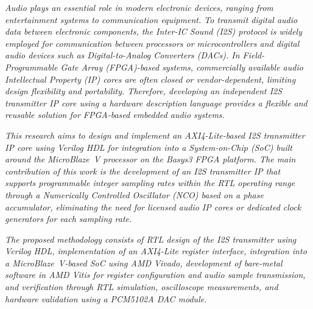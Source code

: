\hspace{1cm}\textit{Audio plays an essential role in modern electronic devices, ranging from entertainment systems to communication equipment. To transmit digital audio data between electronic components, the Inter-IC Sound (I2S) protocol is widely employed for communication between processors or microcontrollers and digital audio devices such as Digital-to-Analog Converters (DACs). In Field-Programmable Gate Array (FPGA)-based systems, commercially available audio Intellectual Property (IP) cores are often closed or vendor-dependent, limiting design flexibility and portability. Therefore, developing an independent I2S transmitter IP core using a hardware description language provides a flexible and reusable solution for FPGA-based embedded audio systems.}

\par\vspace{0.8em}

\hspace{1cm}\textit{This research aims to design and implement an AXI4-Lite-based I2S transmitter IP core using Verilog HDL for integration into a System-on-Chip (SoC) built around the MicroBlaze~V processor on the Basys3 FPGA platform. The main contribution of this work is the development of an I2S transmitter IP that supports programmable integer sampling rates within the RTL operating range through a Numerically Controlled Oscillator (NCO) based on a phase accumulator, eliminating the need for licensed audio IP cores or dedicated clock generators for each sampling rate.}

\par\vspace{0.8em}

\hspace{1cm}\textit{The proposed methodology consists of RTL design of the I2S transmitter using Verilog HDL, implementation of an AXI4-Lite register interface, integration into a MicroBlaze~V-based SoC using AMD Vivado, development of bare-metal software in AMD Vitis for register configuration and audio sample transmission, and verification through RTL simulation, oscilloscope measurements, and hardware validation using a PCM5102A DAC module.}

\par\vspace{0.8em}


